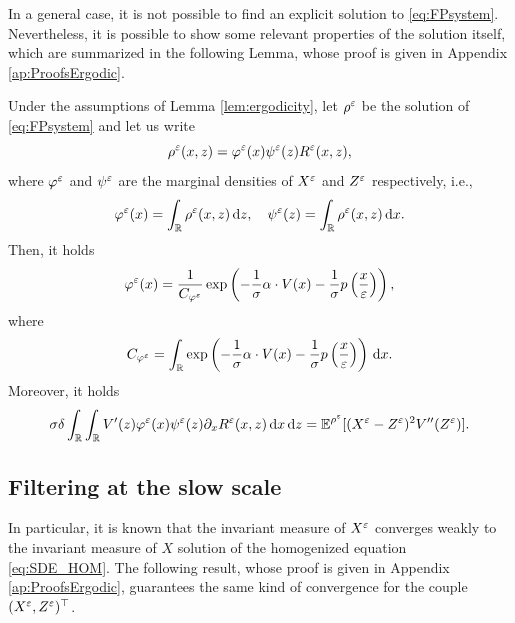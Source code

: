 \documentclass[10pt]{article}
\begin{document}
In a general case, it is not possible to find an explicit solution to \eqref{eq:FPsystem}. Nevertheless, it is possible to show some relevant properties of the solution itself, which are summarized in the following Lemma, whose proof is given in Appendix \ref{ap:ProofsErgodic}.

\begin{lemma}\label{lem:FPMarginal} Under the assumptions of Lemma \ref{lem:ergodicity}, let $\rho^\varepsilon$ be the solution of \eqref{eq:FPsystem} and let us write 
\begin{equation}\label{eq:densityDecomposition}
	\rho^\varepsilon(x, z) = \varphi^\varepsilon(x)\psi^\varepsilon(z)R^\varepsilon(x,z),
\end{equation}
where $\varphi^\varepsilon$ and $\psi^\varepsilon$ are the marginal densities of $X^\varepsilon$ and $Z^\varepsilon$ respectively, i.e., 
\begin{equation}
	\varphi^\varepsilon(x) = \int_{\mathbb{R}} \rho^\varepsilon(x,z) \,\mathrm{d} z, \quad  \psi^\varepsilon(z) = \int_{\mathbb{R}} \rho^\varepsilon(x,z) \,\mathrm{d} x.
\end{equation}
Then, it holds
\begin{equation}\label{eq:marginalX}
	\varphi^\varepsilon(x) = \frac{1}{C_{\varphi^\varepsilon}} \exp\left(-\frac{1}{\sigma} \alpha \cdot V(x) - \frac{1}{\sigma} p \left ( \frac{x}{\varepsilon} \right )\right),
\end{equation}
where
\begin{equation}
	C_{\varphi^\varepsilon} = \int_{\mathbb{R}} \exp\left(-\frac{1}{\sigma} \alpha \cdot V(x) - \frac{1}{\sigma} p \left ( \frac{x}{\varepsilon} \right )\right) \,\mathrm{d} x.
\end{equation}
Moreover, it holds
\begin{equation}
	\sigma \delta \int_{\mathbb{R}} \int_{\mathbb{R}} V'(z) \varphi^\varepsilon(x) \psi^\varepsilon(z) \partial_x R^\varepsilon(x,z) \,\mathrm{d} x \,\mathrm{d} z = \operatorname{\mathbb{E}}^{\rho^\varepsilon}[(X^\varepsilon - Z^\varepsilon)^2 V''(Z^\varepsilon)].
\end{equation}
\end{lemma}

\subsection{Filtering at the slow scale}\label{sec:Slow}

 In particular, it is known that the invariant measure of $X^\varepsilon$ converges weakly to the invariant measure of $X$ solution of the homogenized equation \eqref{eq:SDE_HOM}. The following result, whose proof is given in Appendix \ref{ap:ProofsErgodic}, guarantees the same kind of convergence for the couple $(X^\varepsilon, Z^\varepsilon)^\top$.
\end{document}
